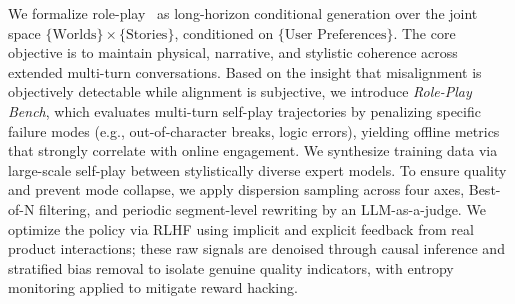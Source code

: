 We formalize role-play~\citep{minimax2026deepdive} as long-horizon conditional generation over the joint space $\{\text{Worlds}\} \times \{\text{Stories}\}$, conditioned on $\{\text{User Preferences}\}$. The core objective is to maintain physical, narrative, and stylistic coherence across extended multi-turn conversations. Based on the insight that misalignment is objectively detectable while alignment is subjective, we introduce \textit{Role-Play Bench}, which evaluates multi-turn self-play trajectories by penalizing specific failure modes (e.g., out-of-character breaks, logic errors), yielding offline metrics that strongly correlate with online engagement. We synthesize training data via large-scale self-play between stylistically diverse expert models. To ensure quality and prevent mode collapse, we apply dispersion sampling across four axes, Best-of-N filtering, and periodic segment-level rewriting by an LLM-as-a-judge. We optimize the policy via RLHF using implicit and explicit feedback from real product interactions; these raw signals are denoised through causal inference and stratified bias removal to isolate genuine quality indicators, with entropy monitoring applied to mitigate reward hacking.
